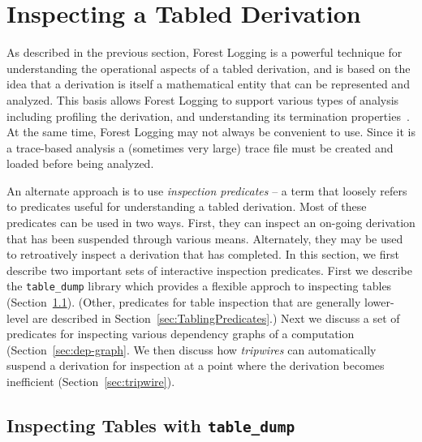 
\section{Inspecting a Tabled Derivation} \label{sec:suspend-analyze}

As described in the previous section, Forest Logging is a powerful
technique for understanding the operational aspects of a tabled
derivation, and is based on the idea that a derivation is itself a
mathematical entity that can be represented and analyzed.  This basis
allows Forest Logging to support various types of analysis including
profiling the derivation, and understanding its termination
properties~\cite{LiaK13,LiaK13a}.  At the same time, Forest Logging
may not always be convenient to use.  Since it is a trace-based
analysis a (sometimes very large) trace file must be created and
loaded before being analyzed.

An alternate approach is to use {\em inspection predicates} -- a term
that loosely refers to predicates useful for understanding a tabled
derivation.  Most of these predicates can be used in two ways.  First,
they can inspect an on-going derivation that has been suspended
through various means.  Alternately, they may be used to retroatively
inspect a derivation that has completed.  In this section, we first
describe two important sets of interactive inspection predicates.
First we describe the {\tt table\_dump} library which provides a
flexible approch to inspecting tables
(Section~\ref{sec:table-dump}). (Other, predicates for table
inspection that are generally lower-level are described in
Section~\ref{sec:TablingPredicates}.)  Next we discuss a set of
predicates for inspecting various dependency graphs of a computation
(Section~\ref{sec:dep-graph}.  We then discuss how {\em tripwires} can
automatically suspend a derivation for inspection at a point where the
derivation becomes inefficient (Section~\ref{sec:tripwire}).

\subsection{Inspecting Tables with {\tt table\_dump}} \label{sec:table-dump}

